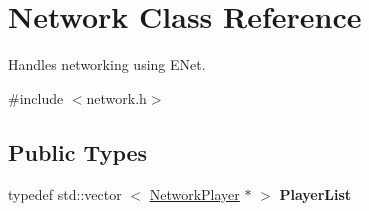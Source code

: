 \hypertarget{classNetwork}{
\section{\-Network \-Class \-Reference}
\label{d5/d16/classNetwork}
}


\-Handles networking using \-E\-Net.  




{\ttfamily \#include $<$network.\-h$>$}

\subsection*{\-Public \-Types}
\begin{DoxyCompactItemize}
\item 
\hypertarget{classNetwork_a9bb2b36cd30320df7ce6671acfb51432}{
typedef std\-::vector\*
$<$ \hyperlink{structNetworkPlayer}{\-Network\-Player} $\ast$ $>$ {\bfseries \-Player\-List}}
\label{d5/d16/classNetwork_a9bb2b36cd30320df7ce6671acfb51432}

\end{DoxyCompactItemize}

